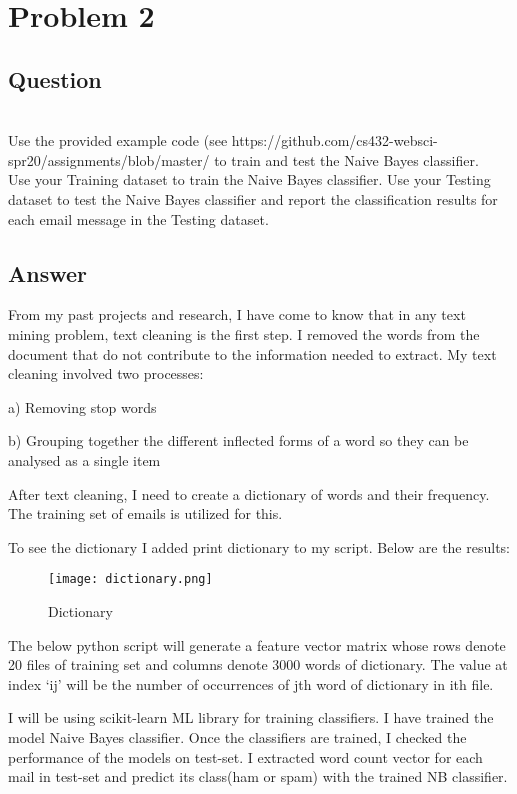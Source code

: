 \documentclass[letterpaper,12pt]{article}
\begin{document}
\section{Problem 2}

\subsection{Question}
\vspace*{10pt}
\\
Use the provided example code (see https://github.com/cs432-websci-spr20/assignments/blob/master/
to train and test the Naive Bayes classifier. \\
Use your Training dataset to train the Naive Bayes classifier.
Use your Testing dataset to test the Naive Bayes classifier and report the classification results for each email message in the Testing dataset.

\subsection{Answer}

From my past projects and research, I have come to know that in any text mining problem, text cleaning is the first step. I removed the words from the document that do not contribute to the information needed to extract. My text cleaning involved two processes:

a) Removing stop words

b) Grouping together the different inflected forms of a word so they can be analysed as a single item

After text cleaning, I need to create a dictionary of words and their frequency. The training set of emails is utilized for this.

To see the dictionary I added print dictionary to my script. Below are the results:
\\

\begin{figure}
\texttt{[image: dictionary.png]}
\caption{Dictionary}
\end{figure}

The below python script will generate a feature vector matrix whose rows denote 20 files of training set and columns denote 3000 words of dictionary. The value at index ‘ij’ will be the number of occurrences of jth word of dictionary in ith file.

I will be using scikit-learn ML library for training classifiers. I have trained the model Naive Bayes classifier. Once the classifiers are trained, I checked the performance of the models on test-set. I extracted word count vector for each mail in test-set and predict its class(ham or spam) with the trained NB classifier. \\
\end{document}
